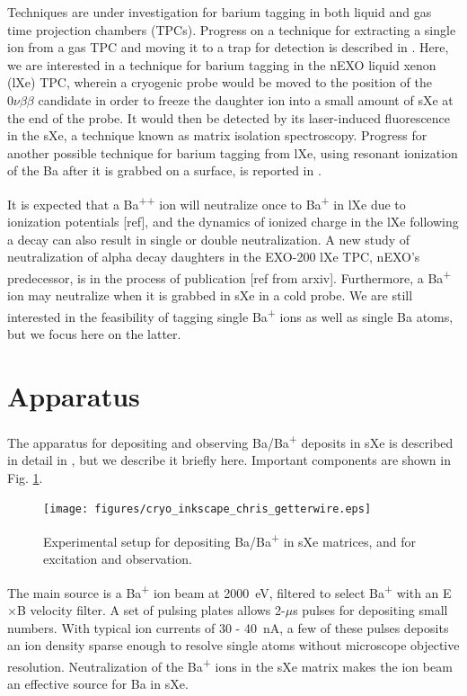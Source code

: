 \documentclass[aps,pra,reprint,superscriptaddress]{revtex4-1}
\begin{document}
Techniques are under investigation for barium tagging in both liquid and gas time projection chambers (TPCs).  Progress on a technique for extracting a single ion from a gas TPC and moving it to a trap for detection is described in \cite{Brunner2015}.  Here, we are interested in a technique for barium tagging in the nEXO liquid xenon (lXe) TPC, wherein a cryogenic probe would be moved to the position of the $0\nu\beta\beta$ candidate in order to freeze the daughter ion into a small amount of sXe at the end of the probe.  It would then be detected by its laser-induced fluorescence in the sXe, a technique known as matrix isolation spectroscopy.  Progress for another possible technique for barium tagging from lXe, using resonant ionization of the Ba after it is grabbed on a surface, is reported in \cite{Twelker2014}.

It is expected that a Ba\textsuperscript{++} ion will neutralize once to Ba\textsuperscript{+} in lXe due to ionization potentials [ref], and the dynamics of ionized charge in the lXe following a decay can also result in single or double neutralization.  A new study of neutralization of alpha decay daughters in the EXO-200 lXe TPC, nEXO's predecessor, is in the process of publication [ref from arxiv].  Furthermore, a Ba\textsuperscript{+} ion may neutralize when it is grabbed in sXe in a cold probe.  We are still interested in the feasibility of tagging single Ba\textsuperscript{+} ions as well as single Ba atoms, but we focus here on the latter.

\section{Apparatus}

The apparatus for depositing and observing Ba/Ba\textsuperscript{+} deposits in sXe is described in detail in \cite{Mong2015}, but we describe it briefly here.  Important components are shown in Fig. \ref{fig:apparatus}.

\begin{figure}
\texttt{[image: figures/cryo\_inkscape\_chris\_getterwire.eps]}
\caption{Experimental setup for depositing Ba/Ba\textsuperscript{+} in sXe matrices, and for excitation and observation.}
\label{fig:apparatus}
\end{figure}

The main source is a Ba\textsuperscript{+} ion beam at 2000~eV, filtered to select Ba\textsuperscript{+} with an E$\times$B velocity filter.  A set of pulsing plates allows 2-$\mu$s pulses for depositing small numbers.  With typical ion currents of 30 - 40~nA, a few of these pulses deposits an ion density sparse enough to resolve single atoms without microscope objective resolution.  Neutralization of the Ba\textsuperscript{+} ions in the sXe matrix makes the ion beam an effective source for Ba in sXe.
\end{document}
